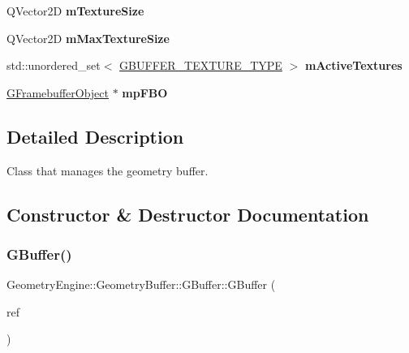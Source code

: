 \begin{DoxyCompactItemize}
Q\+Vector2D {\bfseries m\+Texture\+Size}
\item 
\mbox{\label{class_geometry_engine_1_1_geometry_buffer_1_1_g_buffer_a5dab69ea8f4510c241ccda6817b4af32}} 
Q\+Vector2D {\bfseries m\+Max\+Texture\+Size}
\item 
\mbox{\label{class_geometry_engine_1_1_geometry_buffer_1_1_g_buffer_ad9b17162f29ea4d0600d665bd3f7f0e3}} 
std\+::unordered\+\_\+set$<$ \mbox{\hyperlink{class_geometry_engine_1_1_geometry_buffer_1_1_g_buffer_a718dceafcac1915f7de061108597e1cc}{G\+B\+U\+F\+F\+E\+R\+\_\+\+T\+E\+X\+T\+U\+R\+E\+\_\+\+T\+Y\+PE}} $>$ {\bfseries m\+Active\+Textures}
\item 
\mbox{\label{class_geometry_engine_1_1_geometry_buffer_1_1_g_buffer_adecb16016bf50ab1f50924cee963f432}} 
\mbox{\hyperlink{class_geometry_engine_1_1_geometry_buffer_1_1_g_framebuffer_object}{G\+Framebuffer\+Object}} $\ast$ {\bfseries mp\+F\+BO}
\end{DoxyCompactItemize}


\subsection{Detailed Description}
Class that manages the geometry buffer. 

\subsection{Constructor \& Destructor Documentation}
\mbox{\label{class_geometry_engine_1_1_geometry_buffer_1_1_g_buffer_a9b44aaba6f5e1ef02cdc8ab821d560bb}} 
\subsubsection{\texorpdfstring{GBuffer()}{GBuffer()}}
{\footnotesize\ttfamily Geometry\+Engine\+::\+Geometry\+Buffer\+::\+G\+Buffer\+::\+G\+Buffer (\begin{DoxyParamCaption}\item[{const \mbox{\hyperlink{class_geometry_engine_1_1_geometry_buffer_1_1_g_buffer}{G\+Buffer}} \&}]{ref }\end{DoxyParamCaption})}

